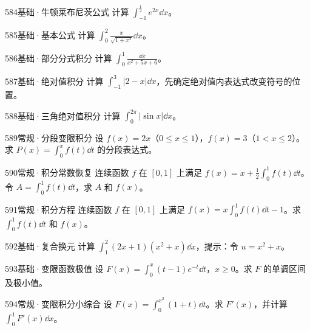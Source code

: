 \begin{exercise}{584}{基础·牛顿莱布尼茨公式}
计算 $\int_{-1}^{\frac{1}{2}}e^{2x}\dd x$。
\end{exercise}
\begin{exercise}{585}{基础·基本公式}
计算 $\int_0^2\frac{x}{\sqrt{1+x^2}}\dd x$。
\end{exercise}
\begin{exercise}{586}{基础·部分分式积分}
计算 $\int_0^1\frac{\dd x}{x^2+5x+6}$。
\end{exercise}
\begin{exercise}{587}{基础·绝对值积分}
计算 $\int_{-1}^3|2-x|\dd x$，先确定绝对值内表达式改变符号的位置。
\end{exercise}
\begin{exercise}{588}{基础·三角绝对值积分}
计算 $\int_0^{2\pi}|\sin x|\dd x$。
\end{exercise}
\begin{exercise}{589}{常规·分段变限积分}
设 $f(x)=2x$（$0\le x\le1$），$f(x)=3$（$1<x\le2$）。求 $P(x)=\int_0^xf(t)\dd t$ 的分段表达式。
\end{exercise}
\begin{exercise}{590}{常规·积分常数恢复}
连续函数 $f$ 在 $[0,1]$ 上满足 $f(x)=x+\frac12\int_0^1f(t)\dd t$。令 $A=\int_0^1f(t)\dd t$，求 $A$ 和 $f(x)$。
\end{exercise}
\begin{exercise}{591}{常规·积分方程}
连续函数 $f$ 在 $[0,1]$ 上满足 $f(x)=x\int_0^1f(t)\dd t-1$。求 $\int_0^1f(t)\dd t$ 和 $f(x)$。
\end{exercise}
\begin{exercise}{592}{基础·复合换元}
计算 $\int_1^2(2x+1)(x^2+x)\dd x$，提示：令 $u=x^2+x$。
\end{exercise}
\begin{exercise}{593}{基础·变限函数极值}
设 $F(x)=\int_0^x(t-1)e^{-t}\dd t$，$x\ge0$。求 $F$ 的单调区间及极小值。
\end{exercise}
\begin{exercise}{594}{常规·变限积分小综合}
设 $F(x)=\int_0^{x^2}(1+t)\dd t$。求 $F'(x)$，并计算 $\int_0^1F'(x)\dd x$。
\end{exercise}
